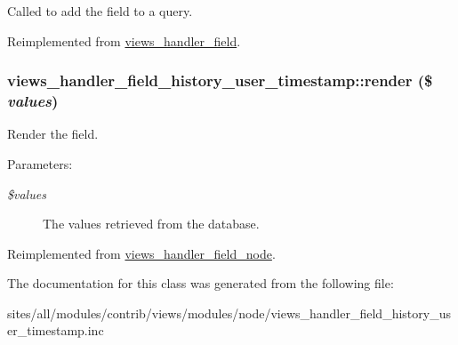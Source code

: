Called to add the field to a query. 

Reimplemented from \hyperlink{classviews__handler__field_4f661f91bcbe80d4a00c30a31456c502}{views\_\-handler\_\-field}.\hypertarget{classviews__handler__field__history__user__timestamp_cc2398dad2662ab9d4faf0ea9daba116}{
\subsubsection[{render}]{\setlength{\rightskip}{0pt plus 5cm}views\_\-handler\_\-field\_\-history\_\-user\_\-timestamp::render (\$ {\em values})}}
\label{classviews__handler__field__history__user__timestamp_cc2398dad2662ab9d4faf0ea9daba116}


Render the field.

\begin{Desc}
\item[Parameters:]
\begin{description}
\item[{\em \$values}]The values retrieved from the database. \end{description}
\end{Desc}


Reimplemented from \hyperlink{classviews__handler__field__node_fe7681e1188ad74ce9b604ad3ba864c0}{views\_\-handler\_\-field\_\-node}.

The documentation for this class was generated from the following file:\begin{CompactItemize}
\item 
sites/all/modules/contrib/views/modules/node/views\_\-handler\_\-field\_\-history\_\-user\_\-timestamp.inc\end{CompactItemize}
